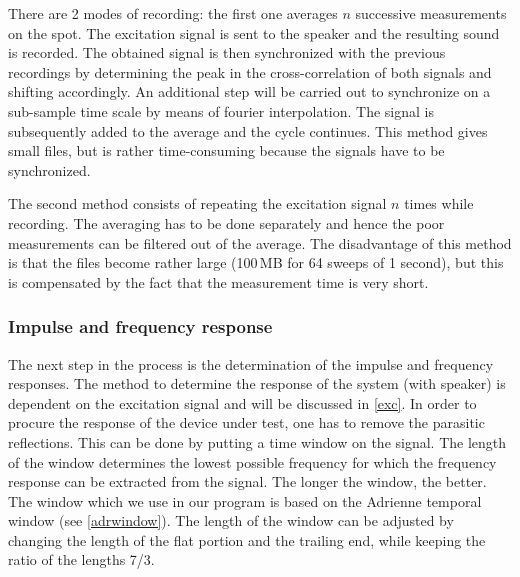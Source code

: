 There are 2 modes of recording: the first one averages $n$ successive measurements on the spot. The excitation signal is sent to the speaker and the resulting sound is recorded. The obtained signal is then synchronized with the previous recordings by determining the peak in the cross-correlation of both signals and shifting accordingly. An additional step will be carried out to synchronize on a sub-sample time scale by means of fourier interpolation. The signal is subsequently added to the average and the cycle continues. This method gives small files, but is rather time-consuming because the signals have to be synchronized.

The second method consists of repeating the excitation signal $n$ times while recording. The averaging has to be done separately and hence the poor  measurements can be filtered out of the average. The disadvantage of this method is that the files become rather large (100\,MB for 64 sweeps of 1 second), but this is compensated by the fact that the measurement time is very short.



\subsubsection*{Impulse and frequency response}
The next step in the process is the determination of the impulse and frequency responses. The method to determine the response of the system (with speaker) is dependent on the excitation signal and will be discussed in \ref{exc}. In order to procure the response of the device under test, one has to remove the parasitic reflections. This can be done by putting a time window on the signal. The length of the window determines the lowest possible frequency for which the frequency response can be extracted from the signal. The longer the window, the better. The window which we use in our program is based on the Adrienne temporal window (see \ref{adrwindow}). The length of the window can be adjusted by changing the length of the flat portion and the trailing end, while keeping the ratio of the lengths 7/3.

